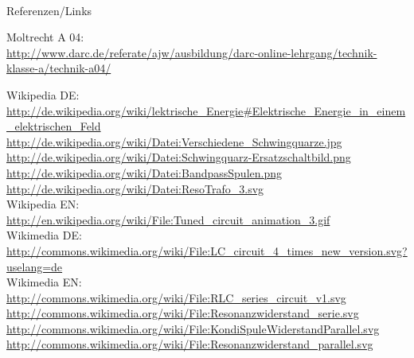 \renewcommand{\refname}{Referenzen}

\hypertarget{refs}{}
\textcolor{white}{} \\ %
\Large Referenzen/Links
\footnotesize

\begin{thebibliography}{}
       Moltrecht A 04: \\
                    \url{http://www.darc.de/referate/ajw/ausbildung/darc-online-lehrgang/technik-klasse-a/technik-a04/}
    
        Wikipedia DE: \\
                    \url{http://de.wikipedia.org/wiki/lektrische_Energie#Elektrische_Energie_in_einem_elektrischen_Feld}\\ 
                    \url{http://de.wikipedia.org/wiki/Datei:Verschiedene_Schwingquarze.jpg}\\
                    \url{http://de.wikipedia.org/wiki/Datei:Schwingquarz-Ersatzschaltbild.png}\\
                    \url{http://de.wikipedia.org/wiki/Datei:BandpassSpulen.png}\\
    				\url{http://de.wikipedia.org/wiki/Datei:ResoTrafo_3.svg}\\
    				
    	Wikipedia EN:\\
    				\url{http://en.wikipedia.org/wiki/File:Tuned_circuit_animation_3.gif}\\
    				
    	Wikimedia DE:\\
    				\url{http://commons.wikimedia.org/wiki/File:LC_circuit_4_times_new_version.svg?uselang=de}\\
   \vspace{1cm}
   	Wikimedia EN:\\
   					\url{http://commons.wikimedia.org/wiki/File:RLC_series_circuit_v1.svg}\\
   					\url{http://commons.wikimedia.org/wiki/File:Resonanzwiderstand_serie.svg}\\
   					\url{http://commons.wikimedia.org/wiki/File:KondiSpuleWiderstandParallel.svg}\\
   					\url{http://commons.wikimedia.org/wiki/File:Resonanzwiderstand_parallel.svg}\\
   				  					
\end{thebibliography} 


